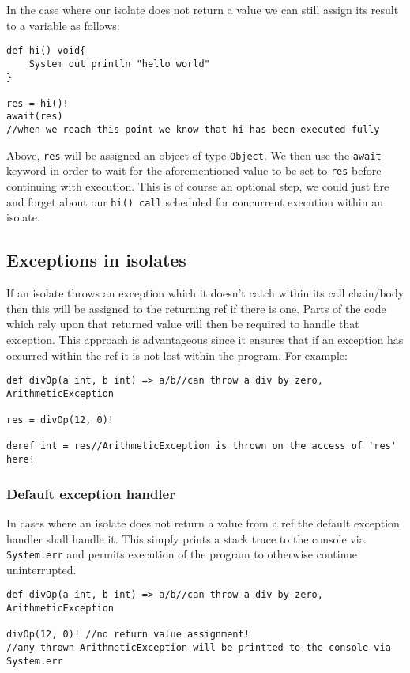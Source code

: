 \documentclass[conc-doc]{subfiles}
\begin{document}
In the case where our isolate does not return a value we can still assign its result to a variable as follows:

\begin{lstlisting}
def hi() void{
	System out println "hello world"
}

res = hi()!
await(res)
//when we reach this point we know that hi has been executed fully
\end{lstlisting}

Above, \lstinline{res} will be assigned an object of type \lstinline{Object}. We then use the \lstinline{await} keyword in order to wait for the aforementioned value to be set to \lstinline{res} before continuing with execution. This is of course an optional step, we could just fire and forget about our \lstinline{hi() call} scheduled for concurrent execution within an isolate.

\subsection{Exceptions in isolates}
If an isolate throws an exception which it doesn't catch within its call chain/body then this will be assigned to the returning ref if there is one. Parts of the code which rely upon that returned value will then be required to handle that exception. This approach is advantageous since it ensures that if an exception has occurred within the ref it is not lost within the program. For example:


\begin{lstlisting}
def divOp(a int, b int) => a/b//can throw a div by zero, ArithmeticException

res = divOp(12, 0)!

deref int = res//ArithmeticException is thrown on the access of 'res' here!
\end{lstlisting}

\subsubsection{Default exception handler}
In cases where an isolate does not return a value from a ref the default exception handler shall handle it. This simply prints a stack trace to the console via \lstinline{System.err} and permits execution of the program to otherwise continue uninterrupted.

\begin{lstlisting}
def divOp(a int, b int) => a/b//can throw a div by zero, ArithmeticException

divOp(12, 0)! //no return value assignment!
//any thrown ArithmeticException will be printted to the console via System.err
\end{lstlisting}
\end{document}
